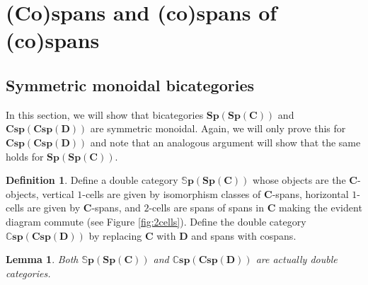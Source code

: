 \documentclass[11pt]{amsart}
\newcommand{\cat}[1]{\mathbf{#1}}
\newcommand{\bispsp}[1]{\mathbf{Sp(Sp(#1))}}
\newcommand{\dblspsp}[1]{\mathbb{S}\mathbf{p(Sp(#1))}}
\newcommand{\bicspcsp}[1]{\mathbf{Csp(Csp(#1))}}
\newcommand{\dblcspcsp}[1]{\mathbb{C}\mathbf{sp(Csp(#1))}}
\newtheorem{lem}[thm]{Lemma}
\theoremstyle{remark}
\theoremstyle{definition}
\newtheorem{defn}[thm]{Definition}
\begin{document}
\section{(Co)spans and (co)spans of (co)spans}                  
\label{sec:SpansSpans}

\subsection{Symmetric monoidal bicategories} %
\label{subsec.SpansSpanssAreSMBicat}

In this section, we will show that bicategories $\bispsp{C}$ and $\bicspcsp{D}$ are symmetric monoidal. Again, we will only prove this for $\bicspcsp{D}$ and note that an analogous argument will show that the same holds for $\bispsp{C}$.  

\begin{defn}
\label{def:DblCatSpanSpan}
	Define a double category $\dblspsp{C}$ whose objects are the $\cat{C}$-objects, vertical $1$-cells are given by isomorphism classes of $\cat{C}$-spans, horizontal $1$-cells are given by $\cat{C}$-spans, and $2$-cells are spans of spans in $\cat{C}$ making the evident diagram commute (see Figure \ref{fig:2cells}). Define the double category $\dblcspcsp{D}$ by replacing $\cat{C}$ with $\cat{D}$ and spans with cospans.  
\end{defn}

\begin{lem}
	\label{lem:SpanSpanDoubleCat}
	Both $\dblspsp{C}$ and $\dblcspcsp{D}$ are actually double categories.  
\end{lem}
\end{document}
